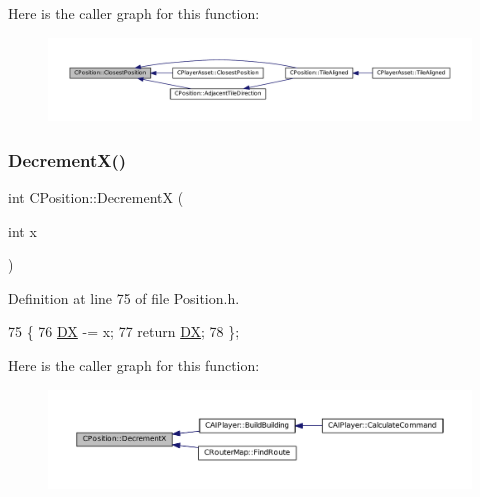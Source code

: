 Here is the caller graph for this function\+:\nopagebreak
\begin{figure}[H]
\begin{center}
\leavevmode
\includegraphics[width=350pt]{classCPosition_a91fd43eeb2c894bcb7577ae87247b726_icgraph}
\end{center}
\end{figure}
\hypertarget{classCPosition_a64f0d8ef8ca26c8b66b0997b3b132416}{}\label{classCPosition_a64f0d8ef8ca26c8b66b0997b3b132416} 
\subsubsection{\texorpdfstring{Decrement\+X()}{DecrementX()}}
{\footnotesize\ttfamily int C\+Position\+::\+DecrementX (\begin{DoxyParamCaption}\item[{int}]{x }\end{DoxyParamCaption})\hspace{0.3cm}{\ttfamily [inline]}}



Definition at line 75 of file Position.\+h.


\begin{DoxyCode}
75                              \{
76             \hyperlink{classCPosition_a28445f9b872169715919074d82044eda}{DX} -= x; 
77             \textcolor{keywordflow}{return} \hyperlink{classCPosition_a28445f9b872169715919074d82044eda}{DX};
78         \};
\end{DoxyCode}
Here is the caller graph for this function\+:\nopagebreak
\begin{figure}[H]
\begin{center}
\leavevmode
\includegraphics[width=350pt]{classCPosition_a64f0d8ef8ca26c8b66b0997b3b132416_icgraph}
\end{center}
\end{figure}
\hypertarget{classCPosition_a51ee44d9e0457d6277567fd8a66fdec7}{}\label{classCPosition_a51ee44d9e0457d6277567fd8a66fdec7} 
